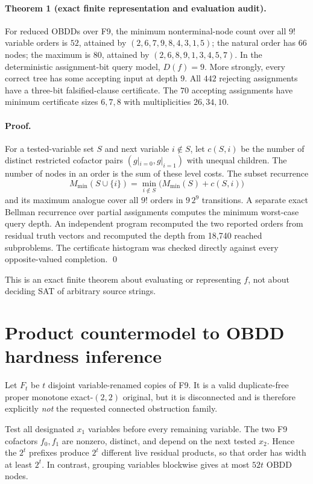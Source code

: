 \documentclass[11pt]{article}
\begin{document}
\paragraph{Theorem 1 (exact finite representation and evaluation audit).}
For reduced OBDDs over F9, the minimum nonterminal-node count over all $9!$ variable orders
is $52$, attained by $(2,6,7,9,8,4,3,1,5)$; the natural order has $66$ nodes; the maximum is
$80$, attained by $(2,6,8,9,1,3,4,5,7)$.  In the deterministic assignment-bit query model,
$D(f)=9$.  More strongly, every correct tree has some accepting input at depth $9$.
All $442$ rejecting assignments have a three-bit falsified-clause certificate.  The $70$
accepting assignments have minimum certificate sizes $6,7,8$ with multiplicities
$26,34,10$.

\paragraph{Proof.}
For a tested-variable set $S$ and next variable $i\notin S$, let $c(S,i)$ be the number of
distinct restricted cofactor pairs $(g|_{i=0},g|_{i=1})$ with unequal children.  The number
of nodes in an order is the sum of these level costs.  The subset recurrence
\[
 M_{\min}(S\cup\{i\})=\min_{i\notin S}\bigl(M_{\min}(S)+c(S,i)\bigr)
\]
and its maximum analogue cover all $9!$ orders in $9\,2^9$ transitions.  A separate exact
Bellman recurrence over partial assignments computes the minimum worst-case query depth.
An independent program recomputed the two reported orders from residual truth vectors and
recomputed the depth from 18,740 reached subproblems.  The certificate histogram was
checked directly against every opposite-valued completion. \qed

This is an exact finite theorem about evaluating or representing $f$, not about deciding
SAT of arbitrary source strings.

\section{Product countermodel to OBDD hardness inference}

Let $F_t$ be $t$ disjoint variable-renamed copies of F9.  It is a valid duplicate-free
proper monotone exact-$(2,2)$ original, but it is disconnected and is therefore explicitly
\emph{not} the requested connected obstruction family.

Test all designated $x_1$ variables before every remaining variable.  The two F9 cofactors
$f_0,f_1$ are nonzero, distinct, and depend on the next tested $x_2$.  Hence the $2^t$
prefixes produce $2^t$ different live residual products, so that order has width at least
$2^t$.  In contrast, grouping variables blockwise gives at most $52t$ OBDD nodes.
\end{document}
